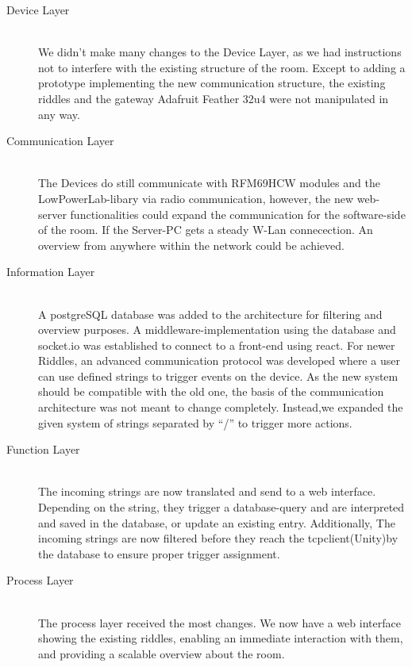 \begin{description}
	\item[Device Layer]\hfill \\
	      We didn't make many changes to the Device Layer, as we had instructions not to interfere with the existing structure of the room.
	      Except to adding a prototype implementing the new communication structure, the existing riddles and the gateway Adafruit Feather 32u4 were not manipulated in any way.
	\item[Communication Layer]\hfill \\
	      The Devices do still communicate with RFM69HCW modules and the LowPowerLab-libary via radio communication,
	      however, the new web-server functionalities could expand the communication for the software-side of the room. If the Server-PC gets a steady W-Lan connecection.
	      An overview from anywhere within the network could be achieved.
	\item[Information Layer]\hfill \\
	      A postgreSQL database was added to the architecture for filtering and overview purposes.
	      A middleware-implementation using the database and socket.io was established to connect to a front-end using react.
	      For newer Riddles, an advanced communication protocol was developed where a user can use defined strings to trigger events on the device.
	      As the new system should be compatible with the old one, the basis of the communication architecture was not meant to change completely.
	      Instead,we expanded the given system of strings separated by “/” to trigger more actions.
	\item[Function Layer]\hfill \\
	      The incoming strings are now translated and send to a web interface.
	      Depending on the string, they trigger a database-query and are interpreted and saved in the database, or update an existing entry.
	      Additionally, The incoming strings are now filtered before they reach the tcpclient(Unity)by the database to ensure proper trigger assignment.
	\item[Process Layer]\hfill \\
	      The process layer received the most changes.
	      We now have a web interface showing the existing riddles, enabling an immediate interaction with them, and providing a scalable overview about the room.

\end{description}


